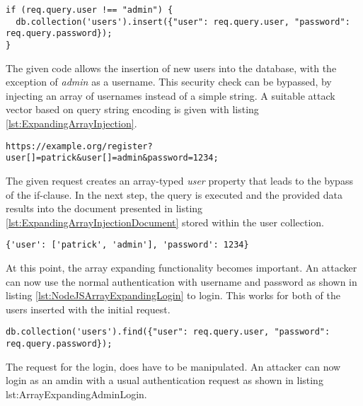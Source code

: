 \begin{lstlisting}[caption={Example for vulnerable MongoDB - NodeJS application}, label={lst:NodeJSCreateUser}]
if (req.query.user !== "admin") {
  db.collection('users').insert({"user": req.query.user, "password": req.query.password});
}
\end{lstlisting}

The given code allows the insertion of new users into the database, with the exception of \emph{admin} as a username. This security check can be bypassed, by injecting an array of usernames instead of a simple string. A suitable attack vector based on query string encoding is given with listing \ref{lst:ExpandingArrayInjection}.\\

\begin{lstlisting}[caption={MongoDB injection with NodeJS's query string module}, label={lst:ExpandingArrayInjection}]
https://example.org/register?user[]=patrick&user[]=admin&password=1234;
\end{lstlisting}

The given request creates an array-typed \emph{user} property that leads to the bypass of the if-clause. In the next step, the query is executed and the provided data results into the document presented in listing \ref{lst:ExpandingArrayInjectionDocument} stored within the user collection.\\

\begin{lstlisting}[caption={Injected query parameter for MongoDB - NodeJS injection}, label={lst:ExpandingArrayInjectionDocument}]
{'user': ['patrick', 'admin'], 'password': 1234}
\end{lstlisting}

At this point, the array expanding functionality becomes important. An attacker can now use the normal authentication with username and password as shown in listing \ref{lst:NodeJSArrayExpandingLogin} to login. This works for both of the users inserted with the initial request. \\

\begin{lstlisting}[caption={Example for vulnerable MongoDB - NodeJS application}, label={lst:NodeJSArrayExpandingLogin}]
db.collection('users').find({"user": req.query.user, "password": req.query.password});
\end{lstlisting}

The request for the login, does have to be manipulated. An attacker can now login as an amdin with a usual authentication request as shown in listing {lst:ArrayExpandingAdminLogin}.\\

